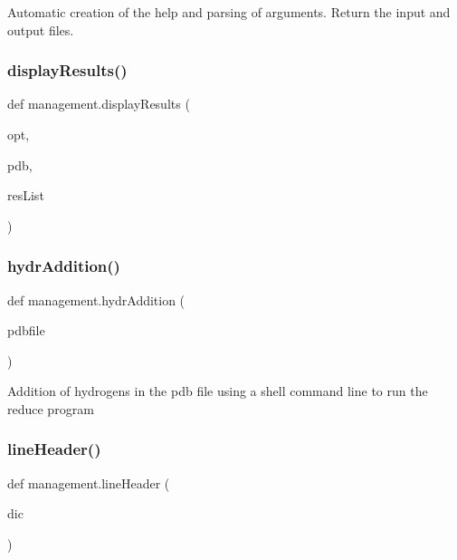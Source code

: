 \begin{DoxyVerb}Automatic creation of the help and parsing of arguments. Return the input and output files.\end{DoxyVerb}
 \mbox{\label{namespacemanagement_afd826b0a557021cd5bfde6f85b453e8b}} 
\subsubsection{\texorpdfstring{display\+Results()}{displayResults()}}
{\footnotesize\ttfamily def management.\+display\+Results (\begin{DoxyParamCaption}\item[{}]{opt,  }\item[{}]{pdb,  }\item[{}]{res\+List }\end{DoxyParamCaption})}

\begin{DoxyVerb}\end{DoxyVerb}
 \mbox{\label{namespacemanagement_a1b38488abcc92ed2c32b1fa6fd12632d}} 
\subsubsection{\texorpdfstring{hydr\+Addition()}{hydrAddition()}}
{\footnotesize\ttfamily def management.\+hydr\+Addition (\begin{DoxyParamCaption}\item[{}]{pdbfile }\end{DoxyParamCaption})}

\begin{DoxyVerb}Addition of hydrogens in the pdb file using a shell command line to run the reduce program\end{DoxyVerb}
 \mbox{\label{namespacemanagement_acdaa6894354bf7d216a7b171b7abde78}} 
\subsubsection{\texorpdfstring{line\+Header()}{lineHeader()}}
{\footnotesize\ttfamily def management.\+line\+Header (\begin{DoxyParamCaption}\item[{}]{dic }\end{DoxyParamCaption})}

